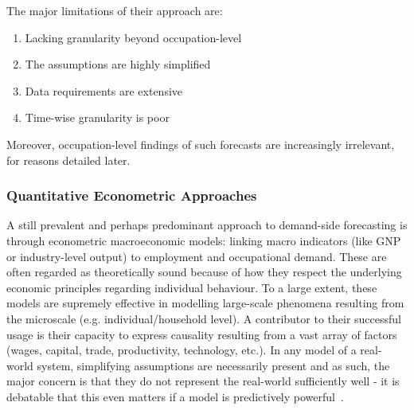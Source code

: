 The major limitations of their approach are:
\begin{enumerate}
  \item Lacking granularity beyond occupation-level
  \item The assumptions are highly simplified
  \item Data requirements are extensive
  \item Time-wise granularity is poor
\end{enumerate}

Moreover, occupation-level findings of such forecasts are increasingly irrelevant, for reasons detailed later.

\subsubsection{Quantitative Econometric Approaches~\cite{wilson_2001_ForecastingSkill}}
A still prevalent and perhaps predominant approach to demand-side forecasting is through econometric macroeconomic models: linking macro indicators (like GNP or industry-level output) to employment and occupational demand.
These are often regarded as theoretically sound because of how they respect the underlying economic principles regarding individual behaviour.
To a large extent, these models are supremely effective in modelling large-scale phenomena resulting from the microscale (e.g. individual/household level).
A contributor to their successful usage is their capacity to express causality resulting from a vast array of factors (wages, capital, trade, productivity, technology, etc.).
In any model of a real-world system, simplifying assumptions are necessarily present and as such, the major concern is that they do not represent the real-world sufficiently well - it is debatable that this even matters if a model is predictively powerful~\cite{Hausman_Hausman_2007}.

